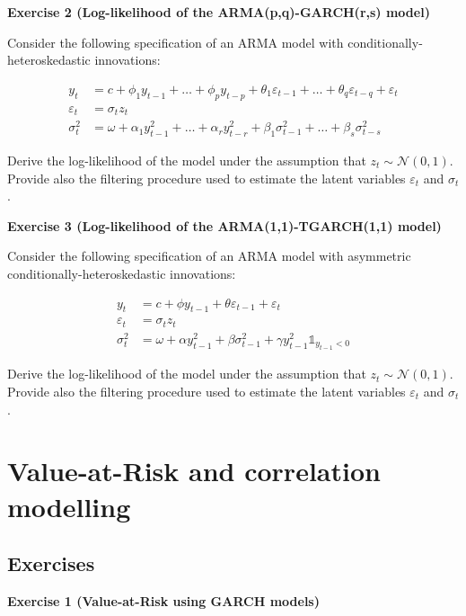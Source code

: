 \documentclass[
]{book}
\begin{document}
\textbf{Exercise 2 (Log-likelihood of the ARMA(p,q)-GARCH(r,s) model)}

Consider the following specification of an ARMA model with conditionally-heteroskedastic innovations:

\[
\begin{aligned}
y_t &= c + \phi_1 y_{t-1} + \dots + \phi_p y_{t-p} + \theta_1 \varepsilon_{t-1} + \dots + \theta_q \varepsilon_{t-q} + \varepsilon_t \\
\varepsilon_t &= \sigma_t z_t \\
\sigma^2_t &= \omega + \alpha_1 y_{t-1}^2 + \dots + \alpha_r y_{t-r}^2 + \beta_1 \sigma^2_{t-1} + \dots + \beta_s \sigma^2_{t-s}
\end{aligned}
\]

Derive the log-likelihood of the model under the assumption that \(z_t \sim \mathcal{N}(0, 1)\). Provide also the filtering procedure used to estimate the latent variables \(\varepsilon_t\) and \(\sigma_t\).

\textbf{Exercise 3 (Log-likelihood of the ARMA(1,1)-TGARCH(1,1) model)}

Consider the following specification of an ARMA model with asymmetric conditionally-heteroskedastic innovations:

\[
\begin{aligned}
y_t &= c + \phi y_{t-1} + \theta \varepsilon_{t-1} + \varepsilon_t \\
\varepsilon_t &= \sigma_t z_t \\
\sigma^2_t &= \omega + \alpha y_{t-1}^2 + \beta \sigma^2_{t-1} + \gamma y_{t-1}^2 \mathbb{1}_{y_{t-1}<0}
\end{aligned}
\]

Derive the log-likelihood of the model under the assumption that \(z_t \sim \mathcal{N}(0, 1)\). Provide also the filtering procedure used to estimate the latent variables \(\varepsilon_t\) and \(\sigma_t\).

\hypertarget{session08}{%
\chapter{Value-at-Risk and correlation modelling}\label{session08}}

\hypertarget{exercises-4}{%
\section{Exercises}\label{exercises-4}}

\textbf{Exercise 1 (Value-at-Risk using GARCH models)}
\end{document}
